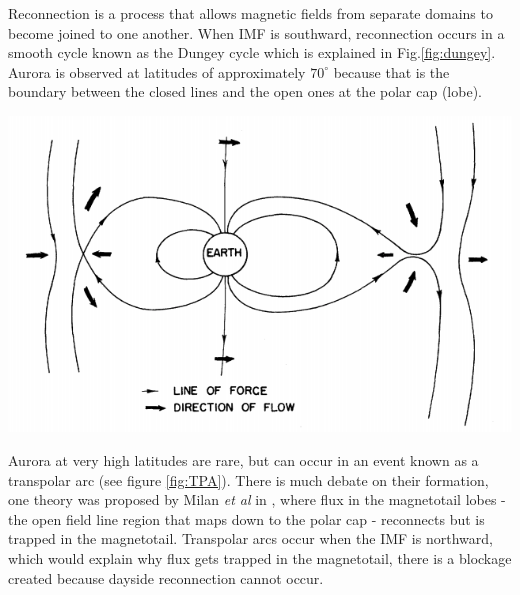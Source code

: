 \documentclass[12pt]{article}
\newenvironment{Figure}
  {\par\medskip\noindent\minipage{\linewidth}}
  {\endminipage\par\medskip}
\begin{document}
Reconnection is a process that allows magnetic fields from separate domains to become joined to one another. When IMF is southward, reconnection occurs in a smooth cycle known as the Dungey cycle \cite{dungeyCycle} which is explained in Fig.\ref{fig:dungey}. Aurora is observed at latitudes of approximately $70^{\circ}$ because that is the boundary between the closed lines and the open ones at the polar cap (lobe).


\begin{Figure}
    \centering
    \includegraphics[width=0.6\linewidth]{dungeyCycle.png}
    \label{fig:dungey}
\end{Figure}

Aurora at very high latitudes are rare, but can occur in an event known as a transpolar arc \cite{polarAurora1, polarAurora2} (see figure \ref{fig:TPA}). There is much debate on their formation, one theory was proposed by Milan \textit{et al} in \cite{TPAdebate}, where flux in the magnetotail lobes - the open field line region that maps down to the polar cap - reconnects but is trapped in the magnetotail. Transpolar arcs occur when the IMF is northward, which would explain why flux gets trapped in the magnetotail, there is a blockage created because dayside reconnection cannot occur.
\end{document}
